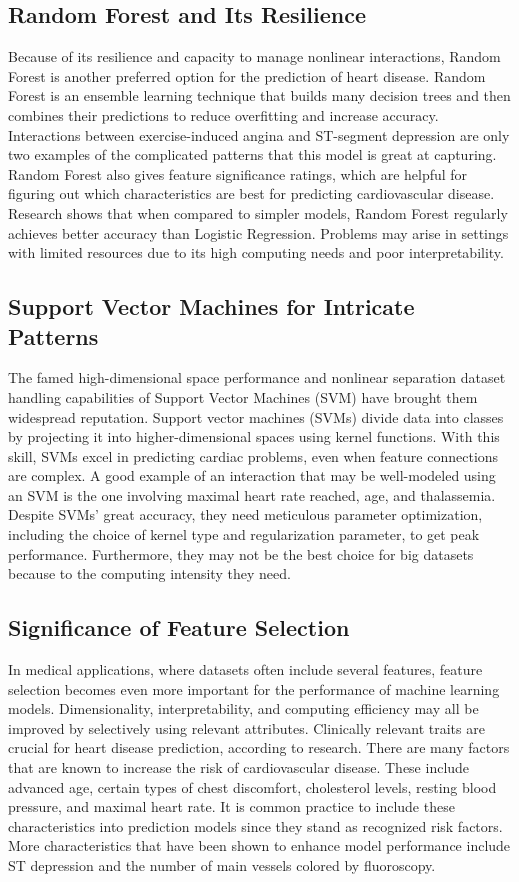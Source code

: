 \subsection{Random Forest and Its Resilience}
Because of its resilience and capacity to manage nonlinear interactions, Random Forest is another preferred option for the prediction of heart disease. Random Forest is an ensemble learning technique that builds many decision trees and then combines their predictions to reduce overfitting and increase accuracy. Interactions between exercise-induced angina and ST-segment depression are only two examples of the complicated patterns that this model is great at capturing. Random Forest also gives feature significance ratings, which are helpful for figuring out which characteristics are best for predicting cardiovascular disease. Research shows that when compared to simpler models, Random Forest regularly achieves better accuracy than Logistic Regression. Problems may arise in settings with limited resources due to its high computing needs and poor interpretability.

\subsection{Support Vector Machines for Intricate Patterns}
The famed high-dimensional space performance and nonlinear separation dataset handling capabilities of Support Vector Machines (SVM) have brought them widespread reputation. Support vector machines (SVMs) divide data into classes by projecting it into higher-dimensional spaces using kernel functions. With this skill, SVMs excel in predicting cardiac problems, even when feature connections are complex. A good example of an interaction that may be well-modeled using an SVM is the one involving maximal heart rate reached, age, and thalassemia. Despite SVMs' great accuracy, they need meticulous parameter optimization, including the choice of kernel type and regularization parameter, to get peak performance. Furthermore, they may not be the best choice for big datasets because to the computing intensity they need.

\subsection{Significance of Feature Selection}
In medical applications, where datasets often include several features, feature selection becomes even more important for the performance of machine learning models. Dimensionality, interpretability, and computing efficiency may all be improved by selectively using relevant attributes. Clinically relevant traits are crucial for heart disease prediction, according to research. There are many factors that are known to increase the risk of cardiovascular disease. These include advanced age, certain types of chest discomfort, cholesterol levels, resting blood pressure, and maximal heart rate. It is common practice to include these characteristics into prediction models since they stand as recognized risk factors. More characteristics that have been shown to enhance model performance include ST depression and the number of main vessels colored by fluoroscopy.

